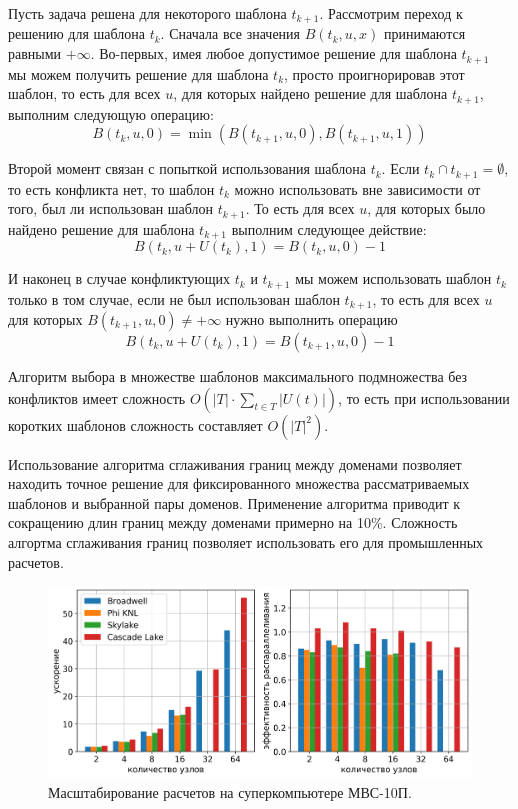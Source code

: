 \documentclass[a4paper,14pt]{extarticle}                     %
\theoremstyle{plain}                                         %
\begin{document}
Пусть задача решена для некоторого шаблона $t_{k + 1}$.
Рассмотрим переход к решению для шаблона $t_k$.
Сначала все значения $B(t_k, u, x)$ принимаются равными $+\infty$.
Во-первых, имея любое допустимое решение для шаблона $t_{k + 1}$ мы можем получить решение для шаблона $t_k$, просто проигнорировав этот шаблон, то есть для всех $u$, для которых найдено решение для шаблона $t_{k + 1}$, выполним следующую операцию:
\begin{equation*}
	B(t_k, u, 0) = \min \left( B(t_{k + 1}, u, 0), B(t_{k + 1}, u, 1) \right)
\end{equation*}

Второй момент связан с попыткой использования шаблона $t_k$.
Если $t_k \cap t_{k + 1} = \emptyset$, то есть конфликта нет, то шаблон $t_k$ можно использовать вне зависимости от того, был ли использован шаблон $t_{k + 1}$.
То есть для всех $u$, для которых было найдено решение для шаблона $t_{k + 1}$ выполним следующее действие:
\begin{equation*}
	B(t_k, u + U(t_k), 1) = B(t_k, u, 0) - 1
\end{equation*}

И наконец в случае конфликтующих $t_k$ и $t_{k + 1}$ мы можем использовать шаблон $t_k$ только в том случае, если не был использован шаблон $t_{k + 1}$, то есть для всех $u$ для которых $B(t_{k + 1}, u, 0) \ne +\infty$ нужно выполнить операцию
\begin{equation*}
	B(t_k, u + U(t_k), 1) = B(t_{k + 1}, u, 0) - 1
\end{equation*}

Алгоритм выбора в множестве шаблонов максимального подмножества без конфликтов имеет сложность $O \left( |T| \cdot \sum_{t \in T}{|U(t)|} \right)$, то есть при использовании коротких шаблонов сложность составляет $O \left( |T|^2 \right)$.

Использование алгоритма сглаживания границ между доменами позволяет находить точное решение для фиксированного множества рассматриваемых шаблонов и выбранной пары доменов.
Применение алгоритма приводит к сокращению длин границ между доменами примерно на 10\%.
Сложность алгортма сглаживания границ позволяет использовать его для промышленных расчетов.

\begin{figure}[!ht]
\centering
\includegraphics[width=1.0\textwidth]{fig/par_surf_2in1_big.png}
\singlespacing
\caption{Масштабирование расчетов на суперкомпьютере МВС-10П.}
\label{fig:text_2_scaling_speedup_eff}
\end{figure}
\end{document}
